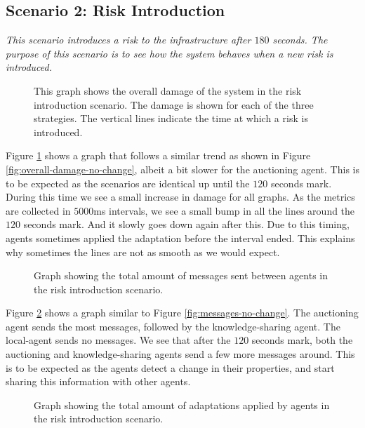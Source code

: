 \subsection{Scenario 2: Risk Introduction}
\label{ssec:scenario-2-results}
\textit{This scenario introduces a risk to the infrastructure after $180$ seconds. The purpose of this scenario is to see how the system behaves when a new risk is introduced.}

\begin{figure}[H]
    \centering
    
    \caption{This graph shows the overall damage of the system in the risk introduction scenario. The damage is shown for each of the three strategies. The vertical lines indicate the time at which a risk is introduced.}
    \label{fig:overall-damage-inroduce-risk}
\end{figure}

Figure \ref{fig:overall-damage-inroduce-risk} shows a graph that follows a similar trend as shown in Figure \ref{fig:overall-damage-no-change}, albeit a bit slower for the auctioning agent. This is to be expected as the scenarios are identical up until the $120$ seconds mark. During this time we see a small increase in damage for all graphs. As the metrics are collected in $5000$ms intervals, we see a small bump in all the lines around the $120$ seconds mark. And it slowly goes down again after this. Due to this timing, agents sometimes applied the adaptation before the interval ended. This explains why sometimes the lines are not as smooth as we would expect.

\begin{figure}[H]
    \centering
    
    \caption{Graph showing the total amount of messages sent between agents in the risk introduction scenario.}
    \label{fig:messages-risk-introduction}
\end{figure}

Figure \ref{fig:messages-risk-introduction} shows a graph similar to Figure \ref{fig:messages-no-change}. The auctioning agent sends the most messages, followed by the knowledge-sharing agent. The local-agent sends no messages. We see that after the $120$ seconds mark, both the auctioning and knowledge-sharing agents send a few more messages around. This is to be expected as the agents detect a change in their properties, and start sharing this information with other agents.

\begin{figure}[H]
    \centering
    
    \caption{Graph showing the total amount of adaptations applied by agents in the risk introduction scenario.}
    \label{fig:proposals-risk-introduction}
\end{figure}

